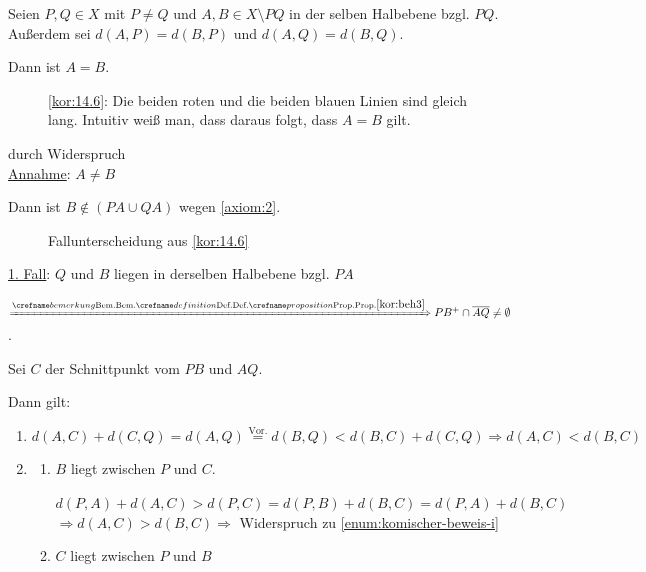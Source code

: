 \begin{bemerkung}\label{kor:14.6}%
    Seien $P, Q \in X$ mit $P \neq Q$ und $A, B \in X \setminus PQ$
    in der selben Halbebene bzgl. $PQ$. Außerdem sei $d(A,P)=d(B,P)$
    und $d(A, Q) = d(B, Q)$.

    Dann ist $A = B$.
\end{bemerkung}

\begin{figure}[htp]
    \centering
    
    \caption{\cref{kor:14.6}: Die beiden roten und die beiden blauen Linien sind gleich lang. Intuitiv weiß man, dass daraus folgt, dass $A = B$ gilt.}
    \label{fig:geometriy-2}
\end{figure}

\begin{beweis} durch Widerspruch\\
    \underline{Annahme}: $A \neq B$

    Dann ist $B \notin (PA \cup QA)$ wegen \ref{axiom:2}.

    \begin{figure}[ht]
        \centering
        \subfloat[1. Fall]{
            
            \label{fig:geometry-3}
        }%
        \subfloat[2. Fall]{
            
            \label{fig:geometry-4}
        }%
        \label{fig:bem:14.6}
        \caption{Fallunterscheidung aus \cref{kor:14.6}}
    \end{figure}

    \underline{1. Fall}: $Q$ und $B$ liegen in derselben Halbebene bzgl. $PA$

    $\xRightarrow{\crefabbr{kor:beh3}} PB^+ \cap \overline{AQ} \neq \emptyset$.

    Sei $C$ der Schnittpunkt vom $PB$ und $AQ$.

    Dann gilt:
    \begin{enumerate}[label=(\roman*)]
        \item $d(A, C) + d(C, Q) = d(A, Q) \overset{\text{Vor.}}{=} d(B, Q) < d(B, C) + d(C, Q) \Rightarrow d(A, C) < d(B, C)$ \label{enum:komischer-beweis-i}
        \item \begin{enumerate}[label=\alph*)]
                \item $B$ liegt zwischen $P$ und $C$.

                      $d(P,A) + d(A, C) > d(P,C) = d(P,B) + d(B,C) = d(P,A) + d(B,C)$
                      $\Rightarrow d(A,C) > d(B,C) \Rightarrow$ Widerspruch zu \cref{enum:komischer-beweis-i}
                \item $C$ liegt zwischen $P$ und $B$


\end{enumerate}
\end{enumerate}
\end{beweis}
